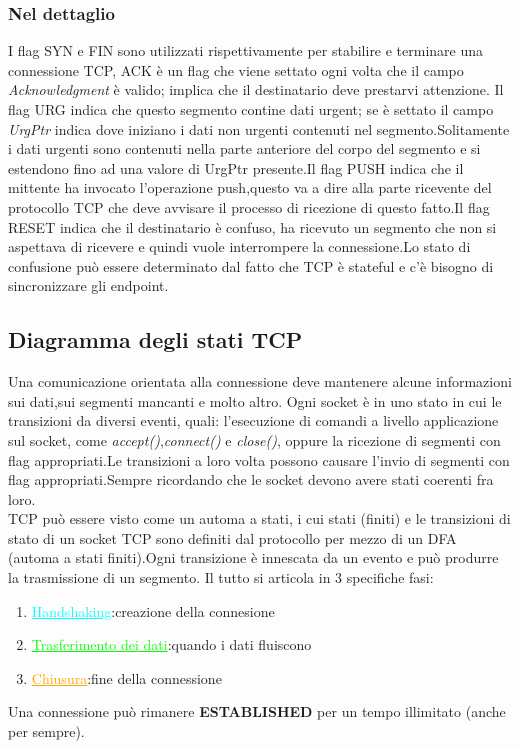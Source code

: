 \subsubsection{Nel dettaglio}
I flag SYN e FIN sono utilizzati rispettivamente per stabilire e terminare una connessione TCP, ACK è un flag che viene settato ogni volta che il campo \textit{Acknowledgment} è valido; implica che il destinatario deve prestarvi attenzione. Il flag URG indica che questo segmento contine dati urgent; se è settato il campo \textit{UrgPtr} indica dove iniziano i dati non urgenti contenuti nel segmento.Solitamente i dati urgenti sono contenuti nella parte anteriore del corpo del segmento e si estendono fino ad una valore di UrgPtr presente.Il flag PUSH indica che il mittente ha invocato l'operazione push,questo va a dire alla parte ricevente del protocollo TCP che deve avvisare il processo di ricezione di questo fatto.Il flag RESET indica che il destinatario è confuso, ha ricevuto un segmento che non si aspettava di ricevere e quindi vuole interrompere la connessione.Lo stato di confusione può essere determinato dal fatto che TCP è stateful e c'è bisogno di sincronizzare gli endpoint.
\subsection{Diagramma degli stati TCP}
Una comunicazione orientata alla connessione deve mantenere alcune informazioni sui dati,sui segmenti mancanti e molto altro. Ogni socket è in uno stato in cui le transizioni da diversi eventi, quali: l'esecuzione di comandi a livello applicazione sul socket, come \textit{accept()},\textit{connect()} e \textit{close()}, oppure la ricezione di segmenti con flag appropriati.Le transizioni a loro volta possono causare l'invio di segmenti con flag appropriati.Sempre ricordando che le socket  devono avere stati coerenti fra loro. \\
TCP può essere visto come un automa a stati, i cui stati (finiti) e le transizioni di stato di un socket TCP sono definiti dal protocollo per mezzo di un DFA (automa a stati finiti).Ogni transizione è innescata da un evento e può produrre la trasmissione di un segmento. Il tutto si articola in 3 specifiche fasi:
\begin{enumerate}
  \item \textcolor{cyan}{\underline{Handshaking}}:creazione della connesione
  \item \textcolor{lime}{\underline{Trasferimento dei dati}}:quando i dati fluiscono
  \item \textcolor{orange}{\underline{Chiusura}}:fine della connessione
\end{enumerate}
Una connessione può rimanere \textbf{ESTABLISHED} per un tempo illimitato (anche per sempre).
